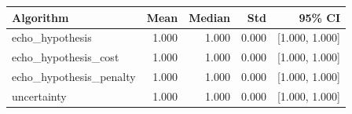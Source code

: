 \begin{tabular}{lrrrr}
\hline
Algorithm & Mean & Median & Std & 95\% CI \\
\hline
echo\_hypothesis & 1.000 & 1.000 & 0.000 & [1.000, 1.000] \\
echo\_hypothesis\_cost & 1.000 & 1.000 & 0.000 & [1.000, 1.000] \\
echo\_hypothesis\_penalty & 1.000 & 1.000 & 0.000 & [1.000, 1.000] \\
uncertainty & 1.000 & 1.000 & 0.000 & [1.000, 1.000] \\
\hline
\end{tabular}
